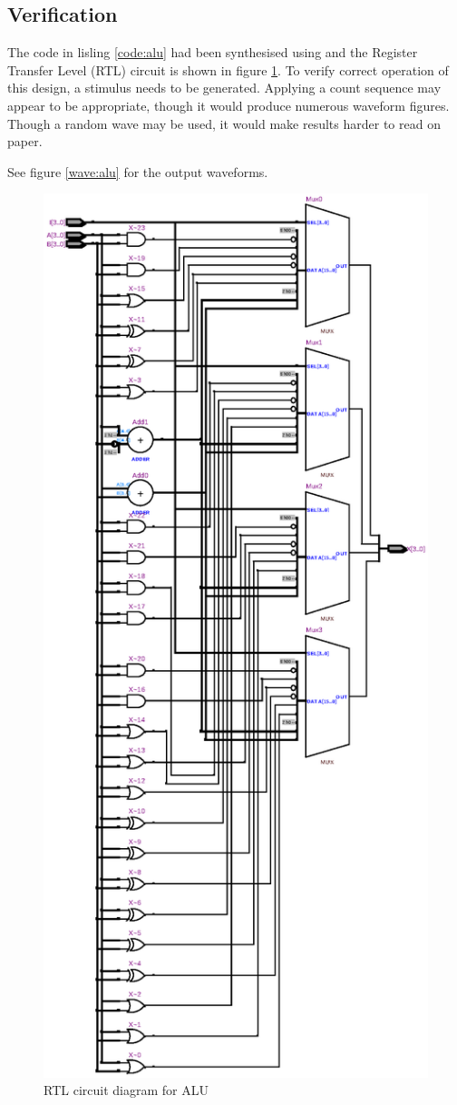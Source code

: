 \documentclass[10pt,a4paper]{report}
\begin{document}
\subsection{Verification}

 The code in lisling \ref{code:alu} had been synthesised
 using and the Register Transfer Level (RTL) circuit is
 shown in figure \ref{rtl:alu}.
 To verify correct operation of this design, a stimulus
 needs to be generated. Applying a count sequence may
 appear to be appropriate, though it would produce
 numerous waveform figures. Though a random wave may
 be used, it would make results harder to read on paper.

 See figure \ref{wave:alu} for the output waveforms.

\begin{figure}
\includegraphics[scale=0.7]{graphs/alu_4bit.rtl.ps}
\caption{\small{RTL circuit diagram for ALU}} \label{rtl:alu}
\end{figure}
\end{document}
